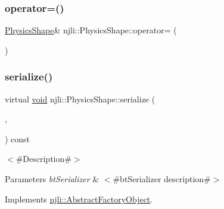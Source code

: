 \mbox{\label{classnjli_1_1_physics_shape_a7c29f1de36c1043e77c070626af242ab}} 
\subsubsection{\texorpdfstring{operator=()}{operator=()}}
{\footnotesize\ttfamily \mbox{\hyperlink{classnjli_1_1_physics_shape}{Physics\+Shape}}\& njli\+::\+Physics\+Shape\+::operator= (\begin{DoxyParamCaption}\item[{const \mbox{\hyperlink{classnjli_1_1_physics_shape}{Physics\+Shape}} \&}]{ }\end{DoxyParamCaption})\hspace{0.3cm}{\ttfamily [protected]}}

\mbox{\label{classnjli_1_1_physics_shape_a2ac8a109a5ad67ee79f40ce8f28337cf}} 
\subsubsection{\texorpdfstring{serialize()}{serialize()}}
{\footnotesize\ttfamily virtual \mbox{\hyperlink{_thread_8h_af1e856da2e658414cb2456cb6f7ebc66}{void}} njli\+::\+Physics\+Shape\+::serialize (\begin{DoxyParamCaption}\item[{\mbox{\hyperlink{_thread_8h_af1e856da2e658414cb2456cb6f7ebc66}{void}} $\ast$}]{,  }\item[{bt\+Serializer $\ast$}]{ }\end{DoxyParamCaption}) const\hspace{0.3cm}{\ttfamily [pure virtual]}}

$<$\#\+Description\#$>$


\begin{DoxyParams}{Parameters}
{\em bt\+Serializer} & $<$\#bt\+Serializer description\#$>$ \\
\hline
\end{DoxyParams}


Implements \mbox{\hyperlink{classnjli_1_1_abstract_factory_object_aad2fbe86fb3bdecf02918a96b9c57976}{njli\+::\+Abstract\+Factory\+Object}}.



